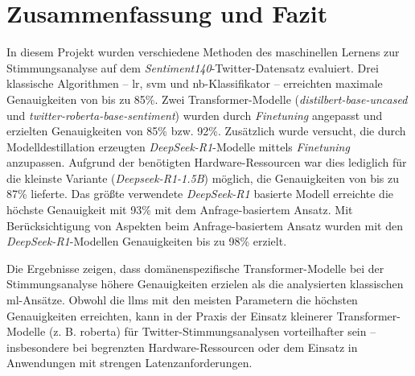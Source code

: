 \section{Zusammenfassung und Fazit}\label{sec:zusammenfassung-und-fazit}

In diesem Projekt wurden verschiedene Methoden des maschinellen Lernens zur Stimmungsanalyse auf dem \textit{Sentiment140}-Twitter-Datensatz evaluiert.
Drei klassische Algorithmen – \gls{lr}, \gls{svm} und \gls{nb}-Klassifikator – erreichten maximale Genauigkeiten von bis zu 85\%.
Zwei Transformer-Modelle (\emph{distilbert-base-uncased} und \emph{twitter-roberta-base-sentiment}) wurden durch \textit{Finetuning} angepasst und erzielten Genauigkeiten von 85\% bzw. 92\%.
Zusätzlich wurde versucht, die durch Modelldestillation erzeugten \emph{DeepSeek-R1}-Modelle mittels \textit{Finetuning} anzupassen.
Aufgrund der benötigten Hardware-Res\-sour\-cen war dies lediglich für die kleinste Variante (\emph{Deepseek-R1-1.5B}) möglich, die Genauigkeiten von bis zu 87\% lieferte.
Das größte verwendete \emph{DeepSeek-R1} basierte Modell erreichte die höchste Genauigkeit mit 93\% mit dem Anfrage-basiertem Ansatz.
Mit Berücksichtigung von Aspekten beim Anfrage-basiertem Ansatz wurden mit den \emph{DeepSeek-R1}-Modellen Genauigkeiten bis zu 98\% erzielt.

Die Ergebnisse zeigen, dass domänenspezifische Transformer-Modelle bei der Stimmungsanalyse höhere Genauigkeiten erzielen als die analysierten klassischen \gls{ml}-Ansätze.
Obwohl die \glspl{llm} mit den meisten Parametern die höchsten Genauigkeiten erreichten, kann in der Praxis der Einsatz kleinerer Transformer-Modelle (z. B. \gls{roberta}) für Twitter-Stimmungsanalysen vorteilhafter sein – insbesondere bei begrenzten Hardware-Ressourcen oder dem Einsatz in Anwendungen mit strengen Latenzanforderungen.
